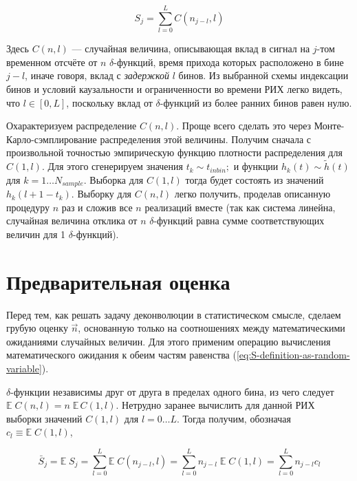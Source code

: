 \begin{equation}
	S_j = \sum_{l=0}^{L} C(n_{j-l}, l)
	\label{eq:S-definition-as-random-variable}
\end{equation}

Здесь $C(n, l)$ --- случайная величина, описывающая вклад в сигнал на $j$-том временном отсчёте от $n$ $\delta$-функций, время прихода которых расположено в бине $j - l$, иначе говоря, вклад с \textit{задержкой} $l$ бинов. Из выбранной схемы индексации бинов и условий каузальности и ограниченности во времени РИХ легко видеть, что $l \in \left[0, L\right]$, поскольку вклад от $\delta$-функций из более ранних бинов равен нулю.

Охарактеризуем распределение $C(n, l)$. Проще всего сделать это через Монте-Карло-сэмплирование распределения этой величины. Получим сначала с произвольной точностью эмпирическую функцию плотности распределения для $C(1, l)$. Для этого сгенерируем значения $t_k \sim t_{inbin};$ и функции $h_k(t) \sim \tilde{h}(t)$ для $k = 1 \ldots N_{sample}$. Выборка для $C(1, l)$ тогда будет состоять из значений $h_k(l + 1 - t_k)$. Выборку для $C(n, l)$ легко получить, проделав описанную процедуру $n$ раз и сложив все $n$ реализаций вместе (так как система линейна, случайная величина отклика от $n$ $\delta$-функций равна сумме соответствующих величин для 1 $\delta$-функций).

\section{Предварительная оценка}
\label{sec:rough-estimation}

Перед тем, как решать задачу деконволюции в статистическом смысле, сделаем грубую оценку $\vec{n}$, основанную только на соотношениях между математическими ожиданиями случайных величин. Для этого применим операцию вычисления математического ожидания к обеим частям равенства (\ref{eq:S-definition-as-random-variable}).

$\delta$-функции независимы друг от друга в пределах одного бина, из чего следует $ \mathbb{E} \; C(n, l) = n \; \mathbb{E} \, C(1, l)$. Нетрудно заранее вычислить для данной РИХ выборки значений $C(1, l)$ для $l = 0 \ldots L$. Тогда получим, обозначая $c_l \equiv \mathbb{E} \; C(1, l)$,

\begin{equation}
	\bar{S}_j = \mathbb{E} \; S_j = \sum_{l=0}^{L} \mathbb{E} \; C(n_{j-l}, l) = \sum_{l=0}^{L} n_{j-l} \; \mathbb{E} \; C(1, l) = \sum_{l=0}^{L} n_{j-l} c_l
\end{equation}

